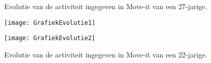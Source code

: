 \begin{figure}[htbp]
    \begin{minipage}[t]{0.48\linewidth} %
        \centering
        \caption[Evolutie van de activiteit van een 27-jarige]{Evolutie van de activiteit ingegeven in Move-it van een 27-jarige.}
        \texttt{[image: GrafiekEvolutie1]}
        \label{fig:evolutie1}
    \end{minipage}
    \hfill
    \begin{minipage}[t]{0.48\linewidth} %
        \centering
        \caption[Evolutie van de activiteit van een 22-jarige]{Evolutie van de activiteit ingegeven in Move-it van een 22-jarige.}
        \texttt{[image: GrafiekEvolutie2]}
        \label{fig:evolutie2}
    \end{minipage}
\end{figure}


